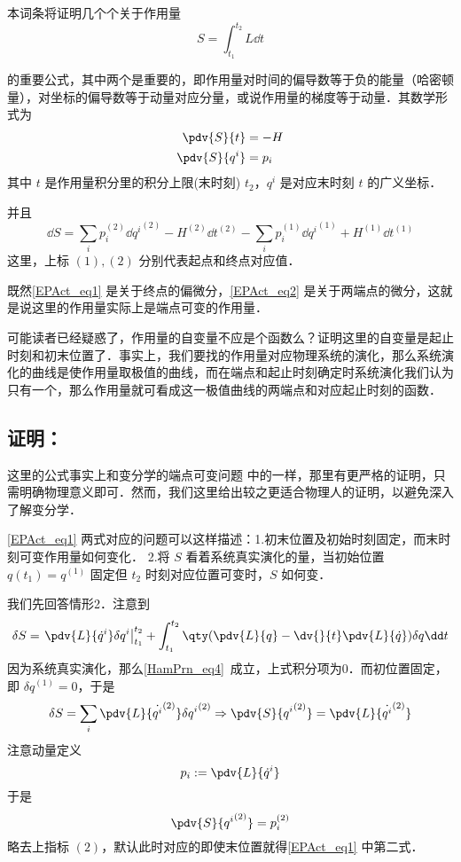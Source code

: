 本词条将证明几个个关于作用量
\begin{equation}
S=\int_{t_1}^{t_2}L\dd t
\end{equation}

的重要公式，其中两个是重要的，即作用量对时间的偏导数等于负的能量（哈密顿量），对坐标的偏导数等于动量对应分量，或说作用量的梯度等于动量．其数学形式为
\begin{equation}\label{EPAct_eq1}
\begin{aligned}
\pdv{S}{t}&=-H\\
\pdv{S}{q^i}&=p_i
\end{aligned}
\end{equation}
其中 $t$ 是作用量积分里的积分上限(末时刻) $t_2$，$q^i$ 是对应末时刻 $t$ 的广义坐标．

并且
\begin{equation}\label{EPAct_eq2}
\dd S=\sum_i p_i^{(2)}\dd {q^i}^{(2)}-H^{(2)}\dd t^{(2)}-\sum_i p_i^{(1)}\dd {q^i}^{(1)}+H^{(1)}\dd t^{(1)}
\end{equation}
这里，上标 $(1),(2)$ 分别代表起点和终点对应值．

既然\autoref{EPAct_eq1} 是关于终点的偏微分，\autoref{EPAct_eq2} 是关于两端点的微分，这就是说这里的作用量实际上是端点可变的作用量．

可能读者已经疑惑了，作用量的自变量不应是个函数么？证明这里的自变量是起止时刻和初末位置了．事实上，我们要找的作用量对应物理系统的演化，那么系统演化的曲线是使作用量取极值的曲线，而在端点和起止时刻确定时系统演化我们认为只有一个，那么作用量就可看成这一极值曲线的两端点和对应起止时刻的函数．
\subsection{证明：}
这里的公式事实上和变分学的端点可变问题 中的一样，那里有更严格的证明，只需明确物理意义即可．然而，我们这里给出较之更适合物理人的证明，以避免深入了解变分学．

\autoref{EPAct_eq1} 两式对应的问题可以这样描述：1.初末位置及初始时刻固定，而末时刻可变作用量如何变化．
2.将 $S$ 看着系统真实演化的量，当初始位置 $q(t_1)=q^{(1)}$ 固定但 $t_2$ 时刻对应位置可变时，$S$ 如何变．

我们先回答情形2．注意到
\begin{equation}
\delta S=\left.\pdv{L}{\dot q^i}\delta q^i\right|_{t_1}^{t_2}+\int_{t_1}^{t_2}\qty(\pdv{L}{q}-\dv{}{t}\pdv{L}{\dot q})\delta q\dd t
\end{equation}
因为系统真实演化，那么\autoref{HamPrn_eq4}~成立，上式积分项为0．而初位置固定，即 $\delta q^{(1)}=0$，于是
\begin{equation}
\delta S=\sum_i\pdv{L}{\dot {q^i}^{(2)}}\delta {q^i}^{(2)}\Rightarrow \pdv{S}{{q^i}^{(2)}}=\pdv{L}{\dot {q^i}^{(2)}}
\end{equation}
注意动量定义
\begin{equation}
p_i:=\pdv{L}{\dot q^i}
\end{equation}
于是
\begin{equation}
\pdv{S}{{q^i}^{(2)}}=p_i^{(2)}
\end{equation}
略去上指标 $(2)$，默认此时对应的即使末位置就得\autoref{EPAct_eq1} 中第二式．

